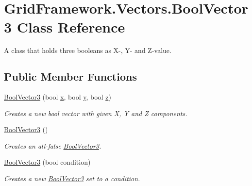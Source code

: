 \hypertarget{class_grid_framework_1_1_vectors_1_1_bool_vector3}{\section{Grid\+Framework.\+Vectors.\+Bool\+Vector3 Class Reference}
\label{class_grid_framework_1_1_vectors_1_1_bool_vector3}
}


A class that holds three booleans as X-\/, Y-\/ and Z-\/value. 


\subsection*{Public Member Functions}
\begin{DoxyCompactItemize}
\item 
\hyperlink{class_grid_framework_1_1_vectors_1_1_bool_vector3_a6cce3aa7bb135e251da5a4493e568e90_a6cce3aa7bb135e251da5a4493e568e90}{Bool\+Vector3} (bool \hyperlink{class_grid_framework_1_1_vectors_1_1_bool_vector3_af3ebd5b8aaa17bac774786a155d32e8f_af3ebd5b8aaa17bac774786a155d32e8f}{x}, bool \hyperlink{class_grid_framework_1_1_vectors_1_1_bool_vector3_ae48d3b107b2d350b68fac8bf8d7f7b0d_ae48d3b107b2d350b68fac8bf8d7f7b0d}{y}, bool \hyperlink{class_grid_framework_1_1_vectors_1_1_bool_vector3_adab045b6c2bfbd95c9d899a245a958ea_adab045b6c2bfbd95c9d899a245a958ea}{z})
\begin{DoxyCompactList}\small\item\em Creates a new bool vector with given X, Y and Z components.\end{DoxyCompactList}\item 
\hyperlink{class_grid_framework_1_1_vectors_1_1_bool_vector3_a3b2b8c6aac9fbcc1b3dc5169821bf50c_a3b2b8c6aac9fbcc1b3dc5169821bf50c}{Bool\+Vector3} ()
\begin{DoxyCompactList}\small\item\em Creates an all-\/{\ttfamily false} \hyperlink{class_grid_framework_1_1_vectors_1_1_bool_vector3}{Bool\+Vector3}.\end{DoxyCompactList}\item 
\hyperlink{class_grid_framework_1_1_vectors_1_1_bool_vector3_a8a82ce49bd529550de2717d80366c930_a8a82ce49bd529550de2717d80366c930}{Bool\+Vector3} (bool condition)
\begin{DoxyCompactList}\small\item\em Creates a new \hyperlink{class_grid_framework_1_1_vectors_1_1_bool_vector3}{Bool\+Vector3} set to a condition.\end{DoxyCompactList}\end{DoxyCompactItemize}
